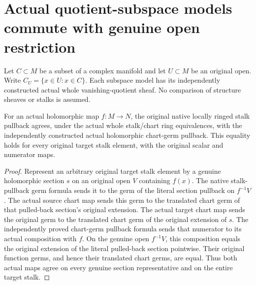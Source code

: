 \section{Actual quotient-subspace models commute with genuine open restriction}
\label{sec:hironaka-actual-analytic-subspace-open-restriction}

Let $C\subset M$ be a subset of a complex manifold and let $U\subset M$
be an original open. Write $C_U=\{x\in U:x\in C\}$. Each subspace model
has its independently constructed actual whole vanishing-quotient sheaf.
No comparison of structure sheaves or stalks is assumed.

\begin{theorem}
\label{hir:actual-analytic-subspace-native-chart-pullback}
\leanok
For an actual holomorphic map $f:M\to N$, the original native locally
ringed stalk pullback agrees, under the actual whole stalk/chart ring
equivalences, with the independently constructed actual holomorphic
chart-germ pullback. This equality holds for every original target
stalk element, with the original scalar and numerator maps.
\end{theorem}
\begin{proof}
Represent an arbitrary original target stalk element by a genuine
holomorphic section $s$ on an original open $V$ containing $f(x)$.
The native stalk-pullback germ formula sends it to the germ of the
literal section pullback on $f^{-1}V$. The actual source chart map sends
this germ to the translated chart germ of that pulled-back section's
original extension. The actual target chart map sends the original
germ to the translated chart germ of the original extension of $s$.
The independently proved chart-germ pullback formula sends that
numerator to its actual composition with $f$. On the genuine open
$f^{-1}V$, this composition equals the original extension of the
literal pulled-back section pointwise. Their original function germs,
and hence their translated chart germs, are equal. Thus both actual
maps agree on every genuine section representative and on the entire
target stalk.
\end{proof}

